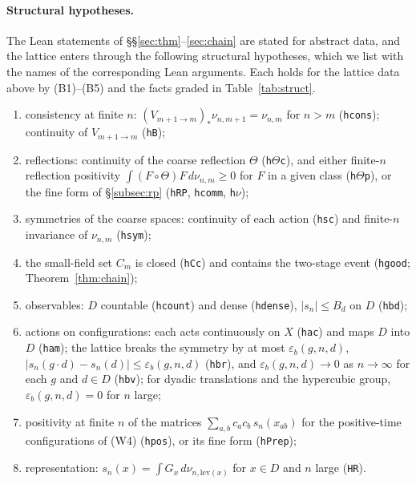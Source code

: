 \documentclass[11pt,a4paper]{article}
\theoremstyle{definition}
\theoremstyle{remark}
\newcommand{\lt}[1]{\texttt{#1}}
\begin{document}
\paragraph{Structural hypotheses.} The Lean statements of \S\S\ref{sec:thm}--\ref{sec:chain} are stated for abstract data, and the lattice enters through the following structural hypotheses, which we list with the names of the corresponding Lean arguments. Each holds for the lattice data above by (B1)--(B5) and the facts graded in Table~\ref{tab:struct}.
\begin{enumerate}[label=(St\arabic*),leftmargin=3em]
\item consistency at finite $n$: $(V_{m+1\to m})_*\nu_{n,m+1}=\nu_{n,m}$ for $n>m$ (\lt{hcons}); continuity of $V_{m+1\to m}$ (\lt{hB});
\item reflections: continuity of the coarse reflection $\Theta$ (\lt{h$\Theta$c}), and either finite-$n$ reflection positivity $\int (F\circ\Theta)F\,d\nu_{n,m}\ge0$ for $F$ in a given class (\lt{h$\Theta$p}), or the fine form of \S\ref{subsec:rp} (\lt{hRP}, \lt{hcomm}, \lt{h$\nu$});
\item symmetries of the coarse spaces: continuity of each action (\lt{hsc}) and finite-$n$ invariance of $\nu_{n,m}$ (\lt{hsym});
\item the small-field set $C_m$ is closed (\lt{hCc}) and contains the two-stage event (\lt{hgood}; Theorem~\ref{thm:chain});
\item observables: $D$ countable (\lt{hcount}) and dense (\lt{hdense}), $|s_n|\le B_d$ on $D$ (\lt{hbd});
\item actions on configurations: each acts continuously on $X$ (\lt{hac}) and maps $D$ into $D$ (\lt{ham}); the lattice breaks the symmetry by at most $\varepsilon_b(g,n,d)$, $|s_n(g\cdot d)-s_n(d)|\le\varepsilon_b(g,n,d)$ (\lt{hbr}), and $\varepsilon_b(g,n,d)\to0$ as $n\to\infty$ for each $g$ and $d\in D$ (\lt{hbv}); for dyadic translations and the hypercubic group, $\varepsilon_b(g,n,d)=0$ for $n$ large;
\item positivity at finite $n$ of the matrices $\sum_{a,b}c_ac_b\,s_n(x_{ab})$ for the positive-time configurations of (W4) (\lt{hpos}), or its fine form (\lt{hPrep});
\item representation: $s_n(x)=\int G_x\,d\nu_{n,\mathrm{lev}(x)}$ for $x\in D$ and $n$ large (\lt{HR}).
\end{enumerate}
\end{document}
